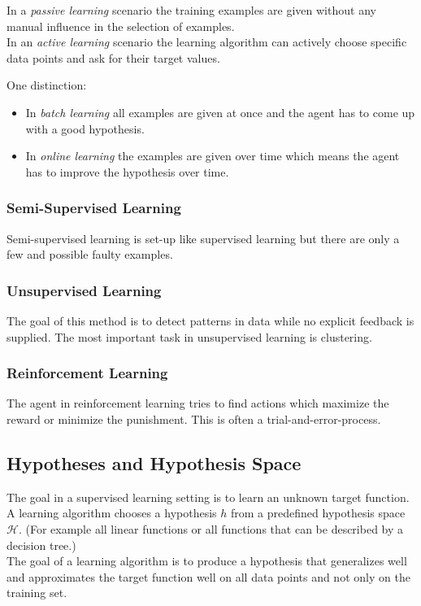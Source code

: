 \documentclass[english]{panikzettel}
\begin{document}
In a \emph{passive learning} scenario the training examples are given without any manual influence in the selection of examples.\\
In an \emph{active learning} scenario the learning algorithm can actively choose specific data points and ask for their target values.

One distinction:
\begin{itemize}
\item In \emph{batch learning} all examples are given at once and the agent has to come up with a good hypothesis.
\item In \emph{online learning} the examples are given over time which means the agent has to improve the hypothesis over time.
\end{itemize}

\subsubsection{Semi-Supervised Learning}
Semi-supervised learning is set-up like supervised learning but there are only a few and possible faulty examples.

\subsubsection{Unsupervised Learning}
The goal of this method is to detect patterns in data while no explicit feedback is supplied. The most important task in unsupervised learning is clustering.

\subsubsection{Reinforcement Learning}
The agent in reinforcement learning tries to find actions which maximize the reward or minimize the punishment. This is often a trial-and-error-process.


\subsection{Hypotheses and Hypothesis Space}
The goal in a supervised learning setting is to learn an unknown target function. A learning algorithm chooses a hypothesis $h$ from a predefined hypothesis space $\mathcal{H}$. (For example all linear functions or all functions that can be described by a decision tree.)\\
The goal of a learning algorithm is to produce a hypothesis that generalizes well and approximates the target function well on all data points and not only on the training set.
\end{document}
